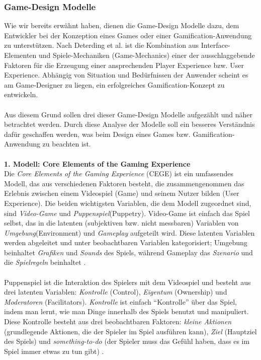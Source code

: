 \documentclass[a4paper,12pt]{scrartcl}
\begin{document}
\subsubsection{Game-Design Modelle}
Wie wir bereits erwähnt haben, dienen die Game-Design Modelle dazu, dem Entwickler bei der Konzeption eines Games oder einer Gamification-Anwendung zu unterstützen. Nach Deterding et al. \cite{Deterding2011} ist die Kombination aus Interface-Elementen und Spiele-Mechaniken (Game-Mechanics) einer der ausschlaggebende Faktoren für die Erzeugung einer ansprechenden Player Experience bzw. User Experience. Abhängig von Situation und Bedürfnissen der Anwender scheint es am Game-Designer zu liegen, ein erfolgreiches Gamification-Konzept zu entwickeln. 
\\\\
Aus diesem Grund sollen drei dieser Game-Design Modelle aufgezählt und näher betrachtet werden. Durch diese Analyse der Modelle soll ein besseres Verständnis dafür geschaffen werden, was beim Design eines Games bzw. Gamification-Anwendung zu beachten ist.
\\\\
\textbf{1. Modell: Core Elements of the Gaming Experience}\\
Die \textit{Core Elements of the Gaming Experience} (CEGE) ist ein umfassendes Modell, das aus verschiedenen Faktoren besteht, die zusammengenommen das Erlebnis zwischen einem Videospiel (Game) und seinem Nutzer bilden (User Experience).  Die beiden wichtigsten Variablen, die dem Modell zugeordnet sind, sind \textit{Video-Game} und \textit{Puppenspiel}(Puppetry). Video-Game ist einfach das Spiel selbst, das in die latenten (subjektiven bzw. nicht messbaren) Variablen von \textit{Umgebung}(Environment) und \textit{Gameplay} aufgeteilt wird. Diese latenten Variablen werden abgeleitet und unter beobachtbaren Variablen kategorisiert; Umgebung beinhaltet \textit{Grafiken} und \textit{Sounds} des Spiels, während Gameplay das \textit{Szenario} und die \textit{Spielregeln} beinhaltet \cite{CEGE2016}.
\\\\
Puppenspiel ist die Interaktion des Spielers mit dem Videospiel und besteht aus drei latenten Variablen: \textit{Kontrolle} (Control), \textit{Eigentum} (Ownership) und \textit{Moderatoren} (Facilitators). \textit{Kontrolle} ist einfach \enquote{Kontrolle} über das Spiel, indem man lernt, wie man Dinge innerhalb des Spiels benutzt und manipuliert. Diese Kontrolle besteht aus drei beobachtbaren Faktoren: \textit{kleine Aktionen} (grundlegende Aktionen, die der Spieler im Spiel ausführen kann), \textit{Ziel} (Hauptziel des Spiels) und \textit{something-to-do} (der Spieler muss das Gefühl haben, dass es im Spiel immer etwas zu tun gibt) \cite{CEGE2016}. 
\end{document}
